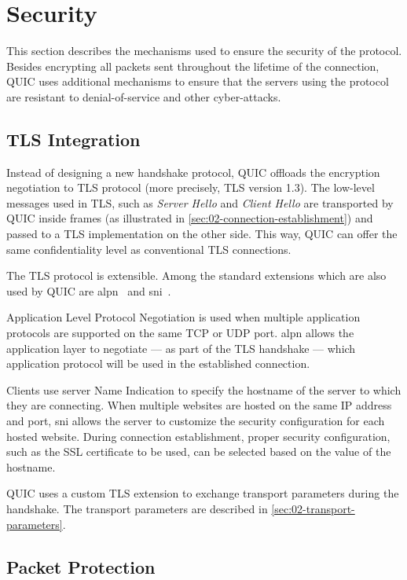 \section{Security}

This section describes the mechanisms used to ensure the security of the protocol. Besides
encrypting all packets sent throughout the lifetime of the connection, QUIC uses additional
mechanisms to ensure that the servers using the protocol are resistant to denial-of-service and
other cyber-attacks.

\subsection{TLS Integration}

Instead of designing a new handshake protocol, QUIC offloads the encryption negotiation to TLS
protocol (more precisely, TLS version 1.3). The low-level messages used in TLS, such as
\textit{Server Hello} and \textit{Client Hello} are transported by QUIC inside \CRYPTO{} frames (as
illustrated in \autoref{sec:02-connection-establishment}) and passed to a TLS implementation on the
other side. This way, QUIC can offer the same confidentiality level as conventional TLS connections.

The TLS protocol is extensible. Among the standard extensions which are also used by QUIC are
\gls{alpn}~\cite{rfc7301} and \gls{sni}~\cite{rfc6066}.

Application Level Protocol Negotiation is used when multiple application protocols are supported on
the same TCP or UDP port. \Gls{alpn} allows the application layer to negotiate --- as part of the
TLS handshake --- which application protocol will be used in the established connection.

Clients use server Name Indication to specify the hostname of the server to which they are
connecting. When multiple websites are hosted on the same IP address and port, \gls{sni} allows the
server to customize the security configuration for each hosted website. During connection
establishment, proper security configuration, such as the SSL certificate to be used, can be
selected based on the value of the hostname.

QUIC uses a custom TLS extension to exchange transport parameters during the handshake. The
transport parameters are described in \autoref{sec:02-transport-parameters}.

\subsection{Packet Protection}\label{sec:02-packet-protection}

